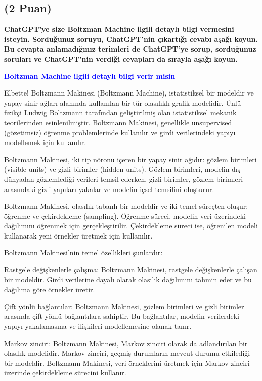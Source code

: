 \documentclass[11pt]{article}
\begin{document}
\subsection{(2 Puan)} \textbf{ChatGPT’ye size Boltzman Machine ilgili detaylı bilgi vermesini isteyin. Sorduğunuz soruyu, ChatGPT'nin çıkartığı cevabı aşağı koyun. Bu cevapta anlamadığınız terimleri de ChatGPT’ye sorup, sorduğunuz soruları ve ChatGPT’nin verdiği cevapları da sırayla aşağı koyun.}

\textbf{\textcolor{blue}{Boltzman Machine ilgili detaylı bilgi verir misin}}

Elbette! Boltzmann Makinesi (Boltzmann Machine), istatistiksel bir modeldir ve yapay sinir ağları alanında kullanılan bir tür olasılıklı grafik modelidir. Ünlü fizikçi Ludwig Boltzmann tarafından geliştirilmiş olan istatistiksel mekanik teorilerinden esinlenilmiştir. Boltzmann Makinesi, genellikle unsupervised (gözetimsiz) öğrenme problemlerinde kullanılır ve girdi verilerindeki yapıyı modellemek için kullanılır.

Boltzmann Makinesi, iki tip nöronu içeren bir yapay sinir ağıdır: gözlem birimleri (visible units) ve gizli birimler (hidden units). Gözlem birimleri, modelin dış dünyadan gözlemlediği verileri temsil ederken, gizli birimler, gözlem birimleri arasındaki gizli yapıları yakalar ve modelin içsel temsilini oluşturur.

Boltzmann Makinesi, olasılık tabanlı bir modeldir ve iki temel süreçten oluşur: öğrenme ve çekirdekleme (sampling). Öğrenme süreci, modelin veri üzerindeki dağılımını öğrenmek için gerçekleştirilir. Çekirdekleme süreci ise, öğrenilen modeli kullanarak yeni örnekler üretmek için kullanılır.

Boltzmann Makinesi'nin temel özellikleri şunlardır:

Rastgele değişkenlerle çalışma: Boltzmann Makinesi, rastgele değişkenlerle çalışan bir modeldir. Girdi verilerine dayalı olarak olasılık dağılımını tahmin eder ve bu dağılıma göre örnekler üretir.

Çift yönlü bağlantılar: Boltzmann Makinesi, gözlem birimleri ve gizli birimler arasında çift yönlü bağlantılara sahiptir. Bu bağlantılar, modelin verilerdeki yapıyı yakalamasına ve ilişkileri modellemesine olanak tanır.

Markov zinciri: Boltzmann Makinesi, Markov zinciri olarak da adlandırılan bir olasılık modelidir. Markov zinciri, geçmiş durumların mevcut durumu etkilediği bir modeldir. Boltzmann Makinesi, veri örneklerini üretmek için Markov zinciri üzerinde çekirdekleme sürecini kullanır.
\end{document}
